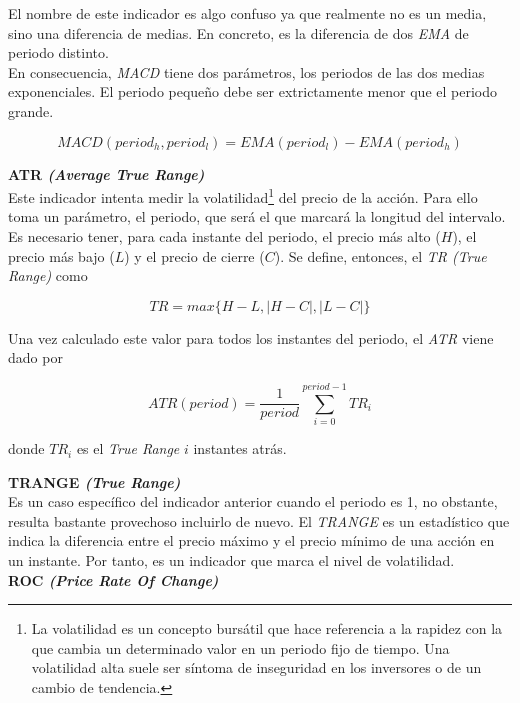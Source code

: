 \begin{appendices}
El nombre de este indicador es algo confuso ya que realmente no es un media, sino una diferencia de medias. En concreto, es la diferencia de dos \textit{EMA} de periodo distinto.\\

En consecuencia, \textit{MACD} tiene dos par\'ametros, los periodos de las dos medias exponenciales. El periodo peque\~no debe ser extrictamente menor que el periodo grande.

\[MACD(period_h, period_l) = EMA(period_l) - EMA(period_h)\] 

\vspace{0.5cm}
\noindent\textbf{ATR \textit{(Average True Range)}}\\

Este indicador intenta medir la volatilidad\footnote{La volatilidad es un concepto burs\'atil que hace referencia a la rapidez con la que cambia un determinado valor en un periodo fijo de tiempo. Una volatilidad alta suele ser s\'intoma de inseguridad en los inversores o de un cambio de tendencia.} del precio de la acci\'on. Para ello toma un par\'ametro, el periodo, que ser\'a el que marcar\'a la longitud del intervalo. Es necesario tener, para cada instante del periodo, el precio m\'as alto ($H$), el precio m\'as bajo ($L$) y el precio de cierre ($C$). Se define, entonces, el \textit{TR (True Range)} como 

\[TR = max\{ H-L, |H-C|, |L-C|\}\]

Una vez calculado este valor para todos los instantes del periodo, el \textit{ATR} viene dado por

\[ATR(period) = \frac{1}{period}\sum\limits_{i=0}^{period-1}TR_{i}\]

donde $TR_{i}$ es el \textit{True Range} $i$ instantes atr\'as.

\vspace{0.5cm}
\noindent\textbf{TRANGE \textit{(True Range)}}\\

Es un caso espec\'ifico del indicador anterior cuando el periodo es 1, no obstante, resulta bastante provechoso incluirlo de nuevo. El \textit{TRANGE} es un estad\'istico que indica la diferencia entre el precio m\'aximo y el precio m\'inimo de una acci\'on en un instante. Por tanto, es un indicador que marca el nivel de volatilidad.\\


\vspace{0.5cm}
\noindent\textbf{ROC \textit{(Price Rate Of Change)}}\\


\end{appendices}
